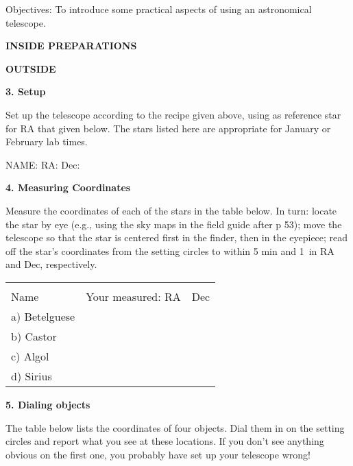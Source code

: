 
\noindent
{Objectives:} To introduce some practical aspects of using an astronomical telescope.

\bigskip\noindent
{\bf INSIDE PREPARATIONS}



\clearpage
\noindent
{\bf OUTSIDE}

\bigskip
\noindent
{\bf 3. Setup}

\medskip\noindent
Set up the telescope according to the recipe given above, using as
reference star for RA that given below. The stars listed here are
appropriate for January or February lab times.

\medskip\begin{center}
NAME:  RA:   Dec:
\end{center}

\bigskip\noindent
{\bf 4. Measuring Coordinates}

\medskip\noindent
Measure the coordinates of each of the stars in the table below. In
turn: locate the star by eye (e.g., using the sky maps in the field
guide after p 53); move the telescope so that the star is centered
first in the finder, then in the eyepiece; read off the star's
coordinates from the setting circles to within 5 min and 1\deg\ in RA
and Dec, respectively.

\begin{center}
\begin{tabular}{lcc} \hline \\ [-6pt]
\hspace{1cm}Name\hspace{1cm} &  \hspace{1cm} Your measured:  RA \hspace{1cm} & Dec \\ [6pt]
\hline
a) Betelguese  & &     \\ \hline
b) Castor  & &  \\ \hline
c) Algol  & &    \\ \hline
d) Sirius  & &   \\ \hline
  \end{tabular}
\end{center}

\bigskip\noindent
{\bf 5. Dialing objects}

\bigskip\noindent The table below lists the coordinates of four
objects. Dial them in on the setting circles and report what you see
at these locations. If you don't see anything obvious on the first
one, you probably have set up your telescope wrong!

